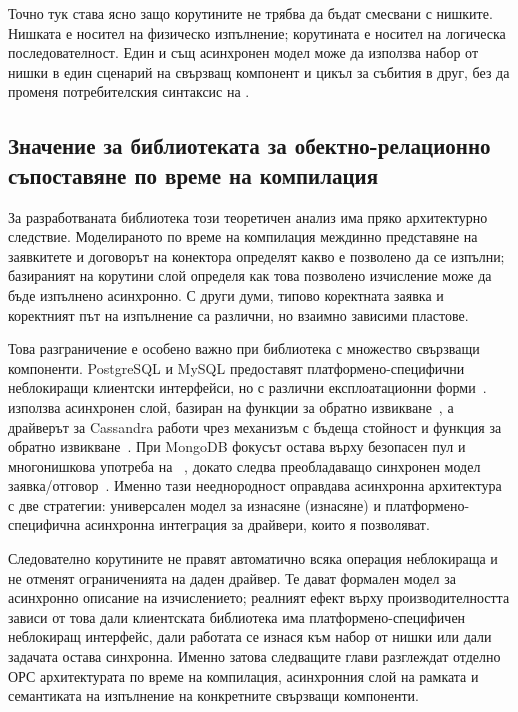 Точно тук става ясно защо корутините не трябва да бъдат смесвани с нишките. Нишката е носител на физическо изпълнение; корутината е носител на логическа последователност. Един и същ асинхронен модел може да използва набор от нишки в един сценарий на свързващ компонент и цикъл за събития в друг, без да променя потребителския синтаксис на .

\subsection{Значение за библиотеката за обектно-релационно съпоставяне по време на компилация}

За разработваната библиотека този теоретичен анализ има пряко архитектурно следствие. Моделираното по време на компилация междинно представяне на заявкитете и договорът на конектора определят какво е позволено да се изпълни; базираният на корутини слой определя как това позволено изчисление може да бъде изпълнено асинхронно. С други думи, типово коректната заявка и коректният път на изпълнение са различни, но взаимно зависими пластове.

Това разграничение е особено важно при библиотека с множество свързващи компоненти. PostgreSQL и MySQL предоставят платформено-специфични неблокиращи клиентски интерфейси, но с различни експлоатационни форми~\cite{libpq_async,mysql_capi_async}.  използва асинхронен слой, базиран на функции за обратно извикване~\cite{hiredis}, а драйверът за Cassandra работи чрез механизъм с бъдеща стойност и функция за обратно извикване~\cite{cassandra_futures}. При MongoDB фокусът остава върху безопасен пул и многонишкова употреба на ~\cite{mongoc_client_pool}, докато  следва преобладаващо синхронен модел заявка/отговор~\cite{libneo4j_client}. Именно тази нееднородност оправдава асинхронна архитектура с две стратегии: универсален модел за изнасяне (изнасяне) и платформено-специфична асинхронна интеграция за драйвери, които я позволяват.

Следователно корутините не правят автоматично всяка операция неблокираща и не отменят ограниченията на даден драйвер. Те дават формален модел за асинхронно описание на изчислението; реалният ефект върху производителността зависи от това дали клиентската библиотека има платформено-специфичен неблокиращ интерфейс, дали работата се изнася към набор от нишки или дали задачата остава синхронна. Именно затова следващите глави разглеждат отделно ОРС архитектурата по време на компилация, асинхронния слой на рамката и семантиката на изпълнение на конкретните свързващи компоненти.
